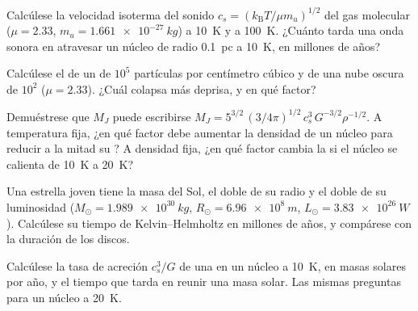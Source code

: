 \begin{exercise}[$\star$]\label{exo:b2:ism-star-formation:3}
Calcúlese la velocidad isoterma del sonido $c_s = (k_{\mathrm B}T/\mu m_u)^{1/2}$ del
gas molecular ($\mu = 2.33$, $m_u = \qty{1.661e-27}{kg}$) a \qty{10}{K} y a
\qty{100}{K}. ¿Cuánto tarda una onda sonora en atravesar un núcleo de radio
\qty{0.1}{pc} a \qty{10}{K}, en millones de años?
\end{exercise}

\begin{exercise}[$\star$]\label{exo:b2:ism-star-formation:4}
Calcúlese el  de un  de $10^5$ partículas por centímetro
cúbico y de una nube oscura de $10^2$ ($\mu = 2.33$). ¿Cuál colapsa
más deprisa, y en qué factor?
\end{exercise}

\begin{exercise}[$\star\star$]\label{exo:b2:ism-star-formation:5}
Demuéstrese que $M_J$ puede escribirse $M_J = 5^{3/2}\,(3/4\pi)^{1/2}\,c_s^3\,G^{-3/2}\rho^{-1/2}$.
A temperatura fija, ¿en qué factor debe aumentar la densidad de un núcleo para reducir a la mitad
su ? A densidad fija, ¿en qué factor cambia la  si
el núcleo se calienta de \qty{10}{K} a \qty{20}{K}?
\end{exercise}

\begin{exercise}[$\star\star$]\label{exo:b2:ism-star-formation:6}
Una estrella joven tiene la masa del Sol, el doble de su radio y el doble de su luminosidad
($M_\odot = \qty{1.989e30}{kg}$, $R_\odot = \qty{6.96e8}{m}$,
$L_\odot = \qty{3.83e26}{W}$). Calcúlese su tiempo de Kelvin--Helmholtz en millones de
años, y compárese con la duración de los discos.
\end{exercise}

\begin{exercise}[$\star\star$]\label{exo:b2:ism-star-formation:7}
Calcúlese la tasa de acreción $c_s^3/G$ de una  en un núcleo a \qty{10}{K}, en
masas solares por año, y el tiempo que tarda en reunir una masa solar. Las mismas
preguntas para un núcleo a \qty{20}{K}.
\end{exercise}

